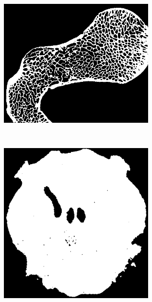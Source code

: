 \documentclass{article}
\begin{document}
\begin{figure}[h!]
\centering \vskip 0pt
\begin{minipage}[b]{0.5\textwidth}%
  \centering \vskip 0pt
  \begin{minipage}[b]{\textwidth}%
    \centering \vskip 0pt
    \includegraphics[width=0.7\textwidth]{images/bonemaskhigh_slice_unprocessed.png}
    \label{fig:bonemaskhigh_slice}
  \end{minipage}
  \\
  \begin{minipage}[b]{\textwidth}%
    \centering \vskip 0pt
    \includegraphics[width=0.7\textwidth]{images/head_of_mouse_slice_unprocessed.png}
    \label{fig:headofmouse_slice}
  \end{minipage}%
\end{minipage}%

\end{figure}
\end{document}
